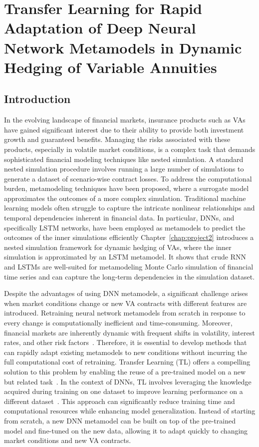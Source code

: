 \chapter{Transfer Learning for Rapid Adaptation of Deep Neural Network Metamodels in Dynamic Hedging of Variable Annuities} \label{chap:project3}

\section{Introduction}

In the evolving landscape of financial markets, insurance products such as VAs have gained significant interest due to their ability to provide both investment growth and guaranteed benefits. 
Managing the risks associated with these products, especially in volatile market conditions, is a complex task that demands sophisticated financial modeling techniques like nested simulation.
A standard nested simulation procedure involves running a large number of simulations to generate a dataset of scenario-wise contract losses.
To address the computational burden, metamodeling techniques have been proposed, where a surrogate model approximates the outcomes of a more complex simulation. 
Traditional machine learning models often struggle to capture the intricate nonlinear relationships and temporal dependencies inherent in financial data.
In particular, DNNs, and specifically LSTM networks, have been employed as metamodels to predict the outcomes of the inner simulations efficiently
Chapter~\ref{chap:project2} introduces a nested simulation framework for dynamic hedging of VAs, where the inner simulation is approximated by an LSTM metamodel.
It shows that crude RNN and LSTMs are well-suited for metamodeling Monte Carlo simulation of financial time series and can capture the long-term dependencies in the simulation dataset.

Despite the advantages of using DNN metamodels, a significant challenge arises when market conditions change or new VA contracts with different features are introduced. 
Retraining neural network metamodels from scratch in response to every change is computationally inefficient and time-consuming.
Moreover, financial markets are inherently dynamic with frequent shifts in volatility, interest rates, and other risk factors~\citep{cont2001empirical}.
Therefore, it is essential to develop methods that can rapidly adapt existing metamodels to new conditions without incurring the full computational cost of retraining.
Transfer Learning (TL) offers a compelling solution to this problem by enabling the reuse of a pre-trained model on a new but related task~\citep{pan2009survey}.
In the context of DNNs, TL involves leveraging the knowledge acquired during training on one dataset to improve learning performance on a different dataset~\citep{yosinski2014transferable}.
This approach can significantly reduce training time and computational resources while enhancing model generalization.
Instead of starting from scratch, a new DNN metamodel can be built on top of the pre-trained model and fine-tuned on the new data, allowing it to adapt quickly to changing market conditions and new VA contracts.

